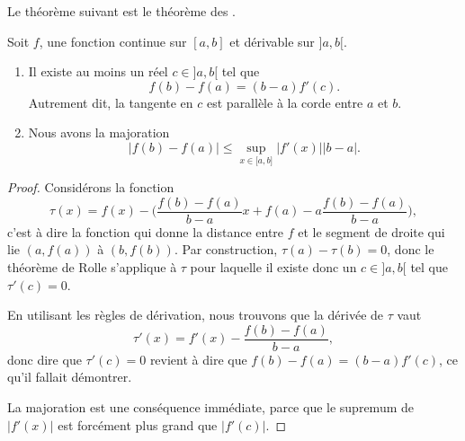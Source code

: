 Le théorème suivant est le théorème des .
\begin{theorem}       \label{ThoAccFinis}
    Soit $f$, une fonction continue sur $[a,b]$ et dérivable sur $]a,b[$.
        \begin{enumerate}
            \item       \label{ITEMooFZONooXJqLyX}
               Il existe au moins un réel $c\in]a,b[$ tel que
                   \begin{equation}
                   f(b)-f(a)=(b-a)f'(c) .
                   \end{equation}
                   Autrement dit, la tangente en \( c\) est parallèle à la corde entre \( a\) et \( b\).
               \item       \label{ITEMooXRQKooDBFpdQ}
               Nous avons la majoration
               \begin{equation}
                   \big| f(b)-f(a) \big|\leq \sup_{x\in\mathopen[ a , b \mathclose]}| f'(x) |  | b-a |.
               \end{equation}
        \end{enumerate}
\end{theorem}

\begin{proof}
    Considérons la fonction
    \begin{equation}
        \tau(x)=f(x)-\big( \frac{ f(b)-f(a) }{ b-a }x + f(a) - a\frac{ f(b)-f(a) }{ b-a } \big),
    \end{equation}
    c'est à dire la fonction qui donne la distance entre $f$ et le segment de droite qui lie $(a,f(a))$ à $(b,f(b))$. Par construction, $\tau(a)-\tau(b)=0$, donc le théorème de Rolle s'applique à $\tau$ pour laquelle il existe donc un $c\in]a,b[$ tel que $\tau'(c)=0$.

    En utilisant les règles de dérivation, nous trouvons que la dérivée de $\tau$ vaut
    \begin{equation}
        \tau'(x)= f'(x)-\frac{ f(b)-f(a) }{ b-a },
    \end{equation}
    donc dire que $\tau'(c)=0$ revient à dire que $f(b)-f(a)=(b-a)f'(c)$, ce qu'il fallait démontrer.

    La majoration est une conséquence immédiate, parce que le supremum de \( | f'(x) |\) est forcément plus grand que \( | f'(c) |\).
\end{proof}

